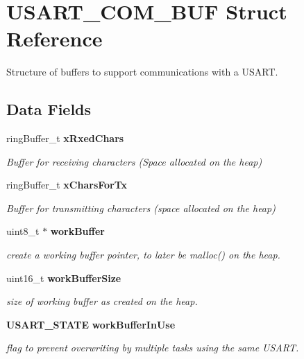 \section{U\+S\+A\+R\+T\+\_\+\+C\+O\+M\+\_\+\+B\+U\+F Struct Reference}
\label{struct_u_s_a_r_t___c_o_m___b_u_f}


Structure of buffers to support communications with a U\+S\+A\+R\+T.  


\subsection*{Data Fields}
\begin{DoxyCompactItemize}
\item 
ring\+Buffer\+\_\+t {\bf x\+Rxed\+Chars}\label{struct_u_s_a_r_t___c_o_m___b_u_f_ae43df5abead9f1303cf8233c282369cb}

\begin{DoxyCompactList}\small\item\em Buffer for receiving characters (Space allocated on the heap) \end{DoxyCompactList}\item 
ring\+Buffer\+\_\+t {\bf x\+Chars\+For\+Tx}\label{struct_u_s_a_r_t___c_o_m___b_u_f_a1d064875ab32e882e5844584036de92e}

\begin{DoxyCompactList}\small\item\em Buffer for transmitting characters (space allocated on the heap) \end{DoxyCompactList}\item 
uint8\+\_\+t $\ast$ {\bf work\+Buffer}\label{struct_u_s_a_r_t___c_o_m___b_u_f_a64c93399d08a42c1765945fd61e55a37}

\begin{DoxyCompactList}\small\item\em create a working buffer pointer, to later be malloc() on the heap. \end{DoxyCompactList}\item 
uint16\+\_\+t {\bf work\+Buffer\+Size}\label{struct_u_s_a_r_t___c_o_m___b_u_f_a9cd4ff1d64ed004d4ea2c11cc0ef3ef7}

\begin{DoxyCompactList}\small\item\em size of working buffer as created on the heap. \end{DoxyCompactList}\item 
{\bf U\+S\+A\+R\+T\+\_\+\+S\+T\+A\+T\+E} {\bf work\+Buffer\+In\+Use}\label{struct_u_s_a_r_t___c_o_m___b_u_f_a6a82334462f37327dcbb8abb1a947314}

\begin{DoxyCompactList}\small\item\em flag to prevent overwriting by multiple tasks using the same U\+S\+A\+R\+T. \end{DoxyCompactList}\end{DoxyCompactItemize}


